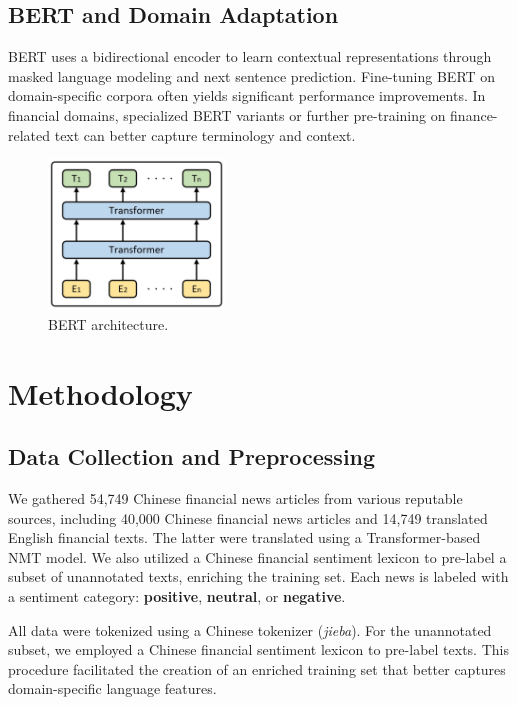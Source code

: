 \documentclass[12pt]{article}
\begin{document}
\subsection{BERT and Domain Adaptation}
BERT \cite{ref2} uses a bidirectional encoder to learn contextual representations through masked language modeling and next sentence prediction. Fine-tuning BERT on domain-specific corpora often yields significant performance improvements. In financial domains, specialized BERT variants or further pre-training on finance-related text can better capture terminology and context.

\begin{figure}[!ht]
	\centering
	\includegraphics[height=4cm]{BERT.png}
	\caption{BERT architecture.}
\end{figure}

\section{Methodology}

\subsection{Data Collection and Preprocessing}
We gathered 54,749 Chinese financial news articles from various reputable sources, including 40,000 Chinese financial news articles and 14,749 translated English financial texts. The latter were translated using a Transformer-based NMT model. We also utilized a Chinese financial sentiment lexicon to pre-label a subset of unannotated texts, enriching the training set. Each news is labeled with a sentiment category: \textbf{positive}, \textbf{neutral}, or \textbf{negative}. 

All data were tokenized using a Chinese tokenizer (\textit{jieba}). For the unannotated subset, we employed a Chinese financial sentiment lexicon to pre-label texts. This procedure facilitated the creation of an enriched training set that better captures domain-specific language features.
\end{document}
